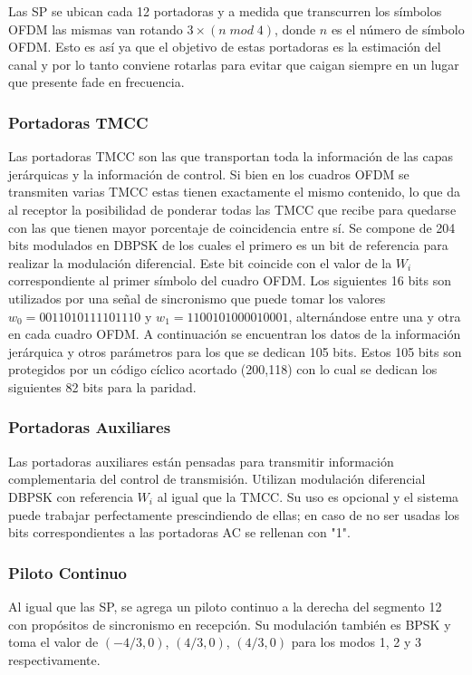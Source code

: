 Las SP se ubican cada 12 portadoras y a medida que transcurren los símbolos OFDM las mismas van rotando $3 \times (n \; mod \; 4)$, donde $n$ es el número de símbolo OFDM. Esto es así ya que el objetivo de estas portadoras es la estimación del canal y por lo tanto conviene rotarlas para evitar que caigan siempre en un lugar que presente fade en frecuencia.



\subsubsection{Portadoras TMCC}

Las portadoras \gls{TMCC} son las que transportan toda la información de las capas jerárquicas y la información de control. Si bien en los cuadros OFDM se transmiten varias TMCC estas tienen exactamente el mismo contenido, lo que da al receptor la posibilidad de ponderar todas las TMCC que recibe para quedarse con las que tienen mayor porcentaje de coincidencia entre sí.
Se compone de 204 bits modulados en \gls{DBPSK} de los cuales el primero es un bit de referencia para realizar la modulación diferencial. Este bit coincide con el valor de la $W_i$ correspondiente al primer símbolo del cuadro OFDM.
Los siguientes 16 bits son utilizados por una señal de sincronismo que puede tomar los valores $w_0 = 0011010111101110$ y $w_1 = 1100101000010001$, alternándose entre una y otra en cada cuadro OFDM.
A continuación se encuentran los datos de la información jerárquica y otros parámetros para los que se dedican 105 bits. Estos 105 bits son protegidos por un código cíclico acortado (200,118) con lo cual se dedican los siguientes 82 bits para la paridad. 
  
\subsubsection{Portadoras Auxiliares}

Las portadoras auxiliares están pensadas para transmitir información complementaria del control de transmisión. Utilizan modulación diferencial DBPSK con referencia $W_i$ al igual que la TMCC. Su uso es opcional y el sistema puede trabajar perfectamente prescindiendo de ellas; en caso de no ser usadas los bits correspondientes a las portadoras AC se rellenan con "1".


\subsubsection{Piloto Continuo}
Al igual que las SP, se agrega un piloto continuo a la derecha del segmento 12 con propósitos de sincronismo en recepción. Su modulación también es BPSK y toma el valor de $(-4/3, 0)$, $(4/3, 0)$, $(4/3, 0)$ para los modos 1, 2 y 3 respectivamente.






